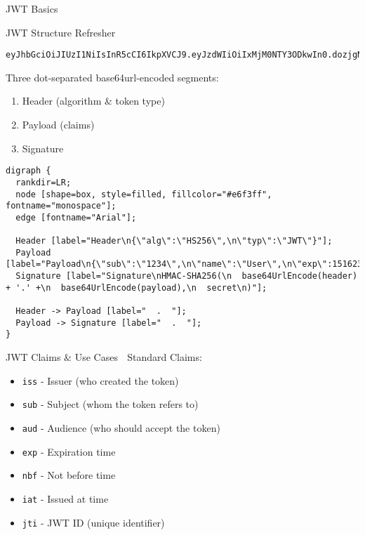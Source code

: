 \documentclass[presentation,aspectratio=169]{beamer}
\begin{document}
\begin{frame}[label={sec:org9be340e},fragile]{JWT Basics}
 \begin{block}{JWT Structure Refresher 🔰}
\begin{verbatim}
eyJhbGciOiJIUzI1NiIsInR5cCI6IkpXVCJ9.eyJzdWIiOiIxMjM0NTY3ODkwIn0.dozjgNryP4J3jVmNHl0w5N_XgL0n3I9PlFUP0THsR8U
\end{verbatim}

Three dot-separated base64url-encoded segments:
\begin{enumerate}
\item \alert{Header} (algorithm \& token type)
\item \alert{Payload} (claims)
\item \alert{Signature}
\end{enumerate}

\begin{verbatim}
digraph {
  rankdir=LR;
  node [shape=box, style=filled, fillcolor="#e6f3ff", fontname="monospace"];
  edge [fontname="Arial"];

  Header [label="Header\n{\"alg\":\"HS256\",\n\"typ\":\"JWT\"}"];
  Payload [label="Payload\n{\"sub\":\"1234\",\n\"name\":\"User\",\n\"exp\":1516239022}"];
  Signature [label="Signature\nHMAC-SHA256(\n  base64UrlEncode(header) + '.' +\n  base64UrlEncode(payload),\n  secret\n)"];

  Header -> Payload [label="  .  "];
  Payload -> Signature [label="  .  "];
}
\end{verbatim}
\end{block}
\begin{block}{JWT Claims \& Use Cases 🔰}
\alert{Standard Claims:}
\begin{itemize}
\item \texttt{iss} - Issuer (who created the token)
\item \texttt{sub} - Subject (whom the token refers to)
\item \texttt{aud} - Audience (who should accept the token)
\item \texttt{exp} - Expiration time
\item \texttt{nbf} - Not before time
\item \texttt{iat} - Issued at time
\item \texttt{jti} - JWT ID (unique identifier)
\end{itemize}


\end{block}
\end{frame}
\end{document}
